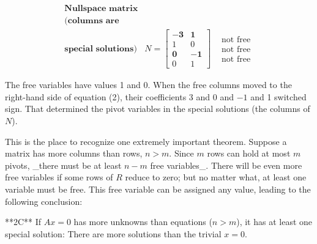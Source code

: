 \[\begin{array}{ll}\textbf{Nullspace matrix}&\\ \textbf{(columns are}&\\ \textbf{special solutions)}&N=\begin{bmatrix}-\textbf{3}&\textbf{1}\\ 1&0\\ \textbf{0}&-\textbf{1}\\ 0&1\end{bmatrix}&\begin{array}{l}\text{not free}\\ \text{not free}\\ \text{not free}\end{array}\end{array}\]

The free variables have values 1 and 0. When the free columns moved to the right-hand side of equation (2), their coefficients 3 and 0 and \(-1\) and 1 switched sign. That determined the pivot variables in the special solutions (the columns of \(N\)).

This is the place to recognize one extremely important theorem. Suppose a matrix has more columns than rows, \(n>m\). Since \(m\) rows can hold at most \(m\) pivots, _there must be at least \(n-m\) free variables_. There will be even more free variables if some rows of \(R\) reduce to zero; but no matter what, at least one variable must be free. This free variable can be assigned any value, leading to the following conclusion:

**2C** If \(Ax=0\) has more unknowns than equations (\(n>m\)), it has at least one special solution: There are more solutions than the trivial \(x=0\).

 